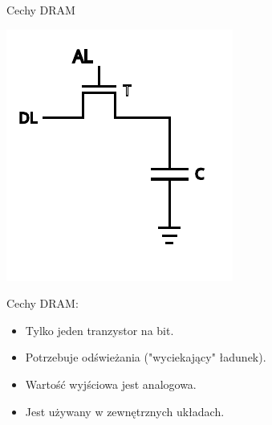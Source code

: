 \documentclass{beamer}
\begin{document}
\begin{frame}{Cechy DRAM}
  \begin{minipage}{0.5\textwidth}
    \includegraphics[scale=1]{assets/DRAM_bit.pdf}
  \end{minipage}%
  \begin{minipage}{0.5\textwidth}
	Cechy DRAM:
	\begin{itemize}
		\pause
		\item Tylko jeden tranzystor na bit.
		\pause
		\item Potrzebuje odświeżania ("wyciekający" ładunek).
		\pause
		\item Wartość wyjściowa jest analogowa.
		\pause
		\item Jest używany w	zewnętrznych układach.	
	\end{itemize}
  \end{minipage}
\end{frame}
\end{document}
